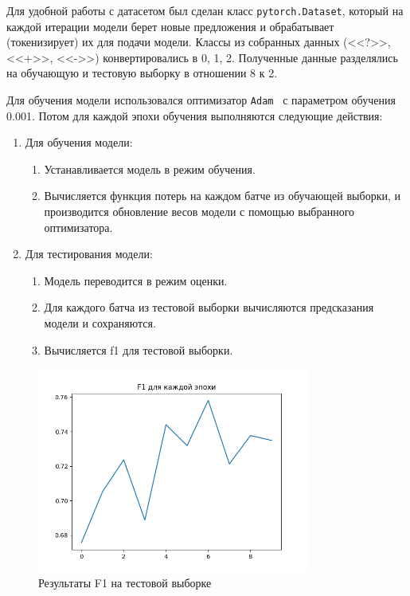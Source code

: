 \documentclass{article}
\begin{document}
Для удобной работы с датасетом был сделан класс \texttt{pytorch.Dataset}, который на каждой итерации модели берет новые предложения и обрабатывает (токенизирует) их для подачи модели. Классы из собранных данных ({}<<?>>{}, {}<<+>>{}, {}<<->>{}) конвертировались в 0, 1, 2. Полученные данные разделялись на обучающую и тестовую выборку в отношении 8 к 2.

Для обучения модели использовался оптимизатор \texttt{Adam}~\autocite{kingma_adam_2017} с параметром обучения 0.001. Потом для каждой эпохи обучения выполняются следующие действия:
\begin{enumerate}
\item Для обучения модели:
\begin{enumerate}
\item Устанавливается модель в режим обучения.
\item Вычисляется функция потерь на каждом батче из обучающей выборки, и производится обновление весов модели с помощью выбранного оптимизатора.
\end{enumerate}

\item Для тестирования модели:
\begin{enumerate}
\item Модель переводится в режим оценки.
\item Для каждого батча из тестовой выборки вычисляются предсказания модели и сохраняются.
\item Вычисляется f1 для тестовой выборки.
\end{enumerate}
\end{enumerate}

\begin{figure}[h!]
\centering
\includegraphics[width=0.8\textwidth]{img/test_f1.png}
\caption{\label{fig:test_f1}Результаты F1 на тестовой выборке}
\end{figure}
\end{document}
